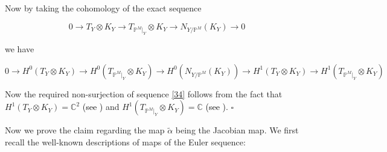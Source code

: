 \documentclass[11pt,twoside]{amsart}
\theoremstyle{plain}
\numberwithin{equation}{section}
\theoremstyle{definition}
\newcommand*{\QEDB}{\hfill\ensuremath{\square}}
\begin{document}
Now by taking the cohomology of the exact sequence 

$$0 \to T_Y \otimes K_Y \to T_{\mathbb{P}^M|_Y} \otimes K_Y \to N_{Y/\mathbb{P}^M}(K_Y) \to 0$$


we have 

$$0 \to H^0(T_Y \otimes K_Y) \to H^0(T_{\mathbb{P}^M|_Y} \otimes K_Y) \to H^0(N_{Y/\mathbb{P}^M}(K_Y)) \to H^1(T_Y \otimes K_Y) \to H^1(T_{\mathbb{P}^M|_Y} \otimes K_Y)$$

Now the required non-surjection of sequence \ref{34} follows from the fact that $H^1(T_Y \otimes K_Y) = \mathbb{C}^2$ \textcolor{black}{(see \cite[Lemma $2.5$, $(4)$]{BMR21})} and $H^1(T_{\mathbb{P}^M|_Y} \otimes K_Y) = \mathbb{C}$ \textcolor{black}{(see \cite[Lemma $2.5$, ($(3)$)]{BMR21})}. \QEDB

\color{blue}

Now we prove the claim regarding the map $\widetilde{\alpha}$ being the Jacobian map.  We first recall the well-known descriptions of maps of the Euler sequence:
\end{document}
